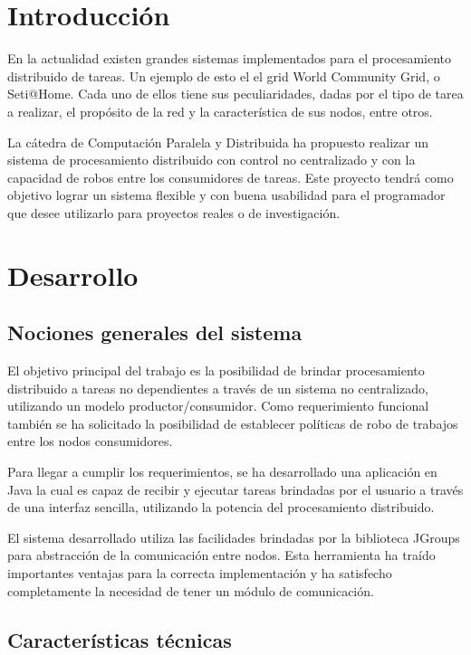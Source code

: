 \documentclass[12pt,a4paper,oneside,spanish]{report}
\begin{document}
\chapter*{Introducción}

En la actualidad existen grandes sistemas implementados para el procesamiento distribuido de tareas. Un ejemplo de esto el el grid World Community Grid\cite{url:WCG}, o Seti@Home\cite{url:seti}. Cada uno de ellos tiene sus peculiaridades, dadas por el tipo de tarea a realizar, el propósito de la red y la característica de sus nodos, entre otros.

La cátedra de Computación Paralela y Distribuida ha propuesto realizar un sistema de procesamiento distribuido con control no centralizado y con la capacidad de robos entre los consumidores de tareas. Este proyecto tendrá como objetivo lograr un sistema flexible y con buena usabilidad para el programador que desee utilizarlo para proyectos reales o de investigación.



\chapter*{Desarrollo}

\section*{Nociones generales del sistema}

El objetivo principal del trabajo es la posibilidad de brindar procesamiento distribuido a tareas no dependientes a través de un sistema no centralizado, utilizando un modelo productor/consumidor. Como requerimiento funcional también se ha solicitado la posibilidad de establecer políticas de robo de trabajos entre los nodos consumidores.

Para llegar a cumplir los requerimientos, se ha desarrollado una aplicación en Java\cite{url:Java} la cual es capaz de recibir y ejecutar tareas brindadas por el usuario a través de una interfaz sencilla, utilizando la potencia del procesamiento distribuido.

El sistema desarrollado utiliza las facilidades brindadas por la biblioteca JGroups\cite{url:JGroups} para abstracción de la comunicación entre nodos. Esta herramienta ha traído importantes ventajas para la correcta implementación y ha satisfecho completamente la necesidad de tener un módulo de comunicación.

\section*{Características técnicas}
\end{document}
